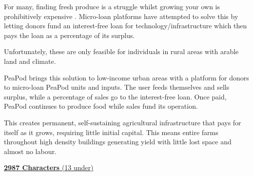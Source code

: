 \documentclass{report}
\begin{document}
For many, finding fresh produce is a struggle whilst growing your own is prohibitively expensive \cite{foodsecurity}. Micro-loan platforms have attempted to solve this by letting donors fund an interest-free loan for technology/infrastructure which then pays the loan as a percentage of its surplus. 

Unfortunately, these are only feasible for individuals in rural areas with arable land and climate.

PeaPod brings this solution to low-income urban areas with a platform for donors to micro-loan PeaPod units and inputs. The user feeds themselves and sells surplus, while a percentage of sales go to the interest-free loan. Once paid, PeaPod continues to produce food while sales fund its operation. 

This creates permanent, self-sustaining agricultural infrastructure that pays for itself as it grows, requiring little initial capital. This means entire farms throughout high density buildings generating yield with little lost space and almost no labour.

\uline{\textbf{2987 Characters} (13 under)}

\newpage

\appendix
\end{document}
